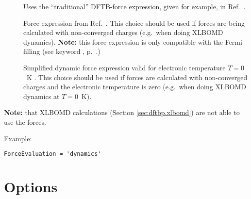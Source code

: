 \begin{description}
\item[] Uses the ``traditional'' DFTB-force expression, given
  for example, in Ref.~\cite{elstner-prb-58-7260}.
\item[] Force expression from Ref.~\cite{aradi-jctc-11-3357}. This choice should be
  used if forces are being calculated with non-converged charges (e.g.\ when doing XLBOMD
  dynamics). \textbf{Note:} this force expression is only compatible with the Fermi filling (see
  keyword , p.~.)
\item [] Simplified dynamic force expression valid for
  electronic temperature \mbox{$T=0$~K} \cite{aradi-jctc-11-3357}.  This choice
  should be used if forces are calculated with non-converged charges and the
  electronic temperature is zero (e.g.\ when doing XLBOMD dynamics at
  \mbox{$T=0$~K}).
\end{description}

\textbf{Note:} that XLBOMD calculations (Section \ref{sec:dftbp.xlbomd}) are not able to use the
 forces.

Example:
\begin{verbatim}
ForceEvaluation = 'dynamics'
\end{verbatim}


\section{Options}
\label{sec:dftbp.Options}

